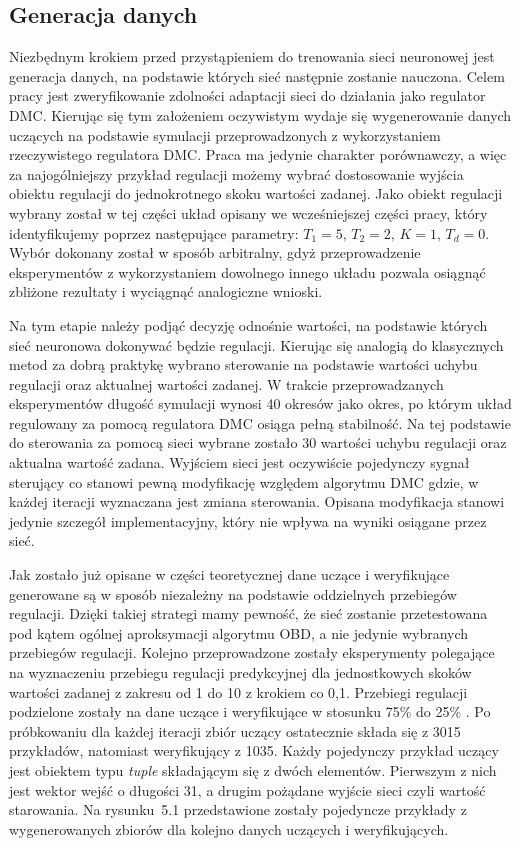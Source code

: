 \subsection{Generacja danych}
Niezbędnym krokiem przed przystąpieniem do trenowania sieci neuronowej jest generacja danych, na podstawie których sieć następnie zostanie nauczona. Celem pracy jest zweryfikowanie zdolności adaptacji sieci do działania jako regulator DMC. Kierując się tym założeniem oczywistym wydaje się wygenerowanie danych uczących na podstawie symulacji przeprowadzonych z wykorzystaniem rzeczywistego regulatora DMC. Praca ma jedynie charakter porównawczy, a więc za najogólniejszy przykład regulacji możemy wybrać dostosowanie wyjścia obiektu regulacji do jednokrotnego skoku wartości zadanej. Jako obiekt regulacji wybrany został w tej części układ opisany we wcześniejszej części pracy, który identyfikujemy poprzez następujące parametry: \( T_1=5, \, T_2=2, \, K=1, \, T_d=0 \). Wybór dokonany został w sposób arbitralny, gdyż przeprowadzenie eksperymentów z wykorzystaniem dowolnego innego układu pozwala osiągnąć zbliżone rezultaty i wyciągnąć analogiczne wnioski.
\par Na tym etapie należy podjąć decyzję odnośnie wartości, na podstawie których sieć neuronowa dokonywać będzie regulacji. Kierując się analogią do klasycznych metod za dobrą praktykę wybrano sterowanie na podstawie wartości uchybu regulacji oraz aktualnej wartości zadanej. W trakcie przeprowadzanych eksperymentów długość symulacji wynosi 40 okresów jako okres, po którym układ regulowany za pomocą regulatora DMC osiąga pełną stabilność. Na tej podstawie do sterowania za pomocą sieci wybrane zostało 30 wartości uchybu regulacji oraz aktualna wartość zadana. Wyjściem sieci jest oczywiście pojedynczy sygnał sterujący co stanowi pewną modyfikację względem algorytmu DMC gdzie, w każdej iteracji wyznaczana jest zmiana sterowania. Opisana modyfikacja stanowi jedynie szczegół implementacyjny, który nie wpływa na wyniki osiągane przez sieć.
\par Jak zostało już opisane w części teoretycznej dane uczące i weryfikujące generowane są w sposób niezależny na podstawie oddzielnych przebiegów regulacji. Dzięki takiej strategi mamy pewność, że sieć zostanie przetestowana pod kątem ogólnej aproksymacji algorytmu OBD, a nie jedynie wybranych przebiegów regulacji. Kolejno przeprowadzone zostały eksperymenty polegające na wyznaczeniu przebiegu regulacji predykcyjnej dla jednostkowych skoków wartości zadanej z zakresu od 1 do 10 z krokiem co 0,1. Przebiegi regulacji podzielone zostały na dane uczące i weryfikujące w stosunku 75\% do 25\% . Po próbkowaniu dla każdej iteracji zbiór uczący ostatecznie składa się z 3015 przykładów, natomiast weryfikujący z 1035. Każdy pojedynczy przykład uczący jest obiektem typu \emph{tuple} składającym się z dwóch elementów. Pierwszym z nich jest wektor wejść o długości 31, a drugim pożądane wyjście sieci czyli wartość starowania. Na rysunku~5.1 przedstawione zostały pojedyncze przykłady z wygenerowanych zbiorów dla kolejno danych uczących i weryfikujących. 

